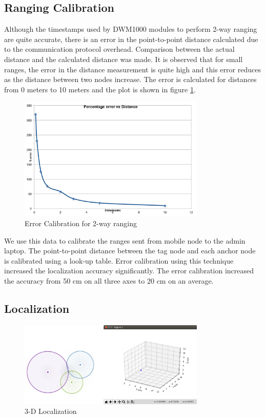 \documentclass[journal,transmag]{IEEEtran}
\begin{document}
\subsection{Ranging Calibration}
Although the timestamps used by DWM1000 modules to perform 2-way ranging are quite accurate, there is an error in the point-to-point distance calculated due to the communication protocol overhead. Comparison between the actual distance and the calculated distance was made. It is observed that for small ranges, the error in the distance measurement is quite high and this error reduces as the distance between two nodes increase. The error is calculated for distances from 0 meters to 10 meters and the plot is shown in figure \ref{errorcalib}. 
\begin{figure}[!h]
\centering
\includegraphics[width=3.5in]{errorcalibfig.png}
\caption{{Error Calibration for 2-way ranging}}
\label{errorcalib}
\end{figure}
We use this data to calibrate the ranges sent from mobile node to the admin laptop. The point-to-point distance between the tag node and each anchor node is calibrated using a look-up table. Error calibration using this technique increased the localization accuracy significantly. The error calibration increased the accuracy from 50 cm on all three axes to 20 cm on an average.




\subsection{Localization}

\begin{figure}[!h]
\centering
\includegraphics[width=3.5in]{3D_localization.png}
\caption{{3-D Localization}}
\label{3dlocalization}
\end{figure}
\end{document}
